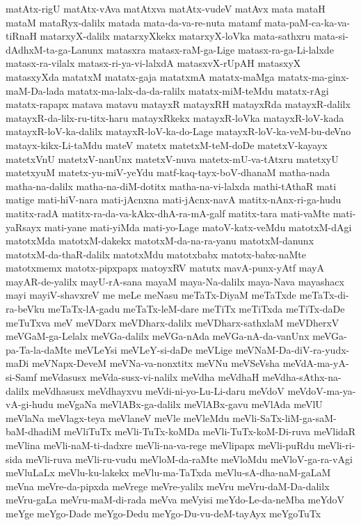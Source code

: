 {matAtx-rigU
matAtx-vAva
matAtxva
matAtx-vudeV
matAvx
mata
mataH
mataM
mataRyx-dalilx
matada
mata-da-va-re-nuta
matamf
mata-paM-ca-ka-va-tiRnaH
matarxyX-dalilx
matarxyXkekx
matarxyX-loVka
mata-sathxru
mata-si-dAdhxM-ta-ga-Lanunx
matasxra
matasx-raM-ga-Lige
matasx-ra-ga-Li-lalxde
matasx-ra-vilalx
matasx-ri-ya-vi-lalxdA
matasxvX-rUpAH
matasxyX
matasxyXda
matatxM
matatx-gaja
matatxmA
matatx-maMga
matatx-ma-ginx-maM-Da-lada
matatx-ma-lalx-da-da-ralilx
matatx-miM-teMdu
matatx-rAgi
matatx-rapapx
matava
matavu
matayxR
matayxRH
matayxRda
matayxR-dalilx
matayxR-da-lilx-ru-titx-haru
matayxRkekx
matayxR-loVka
matayxR-loV-kada
matayxR-loV-ka-dalilx
matayxR-loV-ka-do-Lage
matayxR-loV-ka-veM-bu-deVno
matayx-kikx-Li-taMdu
mateV
matetx
matetxM-teM-doDe
matetxV-kayayx
matetxVnU
matetxV-nanUnx
matetxV-nuva
matetx-mU-va-tAtxru
matetxyU
matetxyuM
matetx-yu-miV-yeYdu
matf-kaq-tayx-boV-dhanaM
matha-nada
matha-na-dalilx
matha-na-diM-dotitx
matha-na-vi-lalxda
mathi-tAthaR
mati
matige
mati-hiV-nara
mati-jAcnxna
mati-jAcnx-navA
matitx-nAnx-ri-ga-hudu
matitx-radA
matitx-ra-da-va-kAkx-dhA-ra-mA-galf
matitx-tara
mati-vaMte
mati-yaRsayx
mati-yane
mati-yiMda
mati-yo-Lage
matoV-katx-veMdu
matotxM-dAgi
matotxMda
matotxM-dakekx
matotxM-da-na-ra-yanu
matotxM-danunx
matotxM-da-thaR-dalilx
matotxMdu
matotxbabx
matotx-babx-naMte
matotxmemx
matotx-pipxpapx
matoyxRV
matutx
mavA-punx-yAtf
mayA
mayAR-de-yalilx
mayU-rA-sana
mayaM
maya-Na-dalilx
maya-Nava
mayashacx
mayi
mayiV-shavxreV
me
meLe
meNasu
meTaTx-DiyaM
meTaTxde
meTaTx-di-ra-beVku
meTaTx-lA-gadu
meTaTx-leM-dare
meTiTx
meTiTxda
meTiTx-daDe
meTuTxva
meV
meVDarx
meVDharx-dalilx
meVDharx-sathxlaM
meVDherxV
meVGaM-ga-Lelalx
meVGa-dalilx
meVGa-nAda
meVGa-nA-da-vanUnx
meVGa-pa-Ta-la-daMte
meVLeYsi
meVLeY-si-daDe
meVLige
meVNaM-Da-diV-ra-yudx-maDi
meVNapx-DeveM
meVNa-va-nonxtitx
meVNu
meVSeVsha
meVdA-ma-yA-si-Samf
meVdasusx
meVda-susx-vi-nalilx
meVdha
meVdhaH
meVdha-sAthx-na-dalilx
meVdhasusx
meVdhayxvu
meVdi-ni-yo-Lu-Li-daru
meVdoV
meVdoV-ma-ya-vA-gi-hudu
meVgaNa
meVlABx-ga-dalilx
meVlABx-gavu
meVlAda
meVlU
meVlaNa
meVlagx-teya
meVlaneV
meVle
meVleMdu
meVli-SaTx-liM-ga-saM-baM-dhadiM
meVliTuTx
meVli-TuTx-koMDa
meVli-TuTx-koM-Di-ruva
meVlidaR
meVlina
meVli-naM-ti-dadxre
meVli-na-va-rege
meVlipapx
meVli-puRdu
meVli-ri-sida
meVli-ruva
meVli-ru-vudu
meVloM-da-raMte
meVloMdu
meVloV-ga-ra-vAgi
meVluLaLx
meVlu-ku-lakekx
meVlu-ma-TaTxda
meVlu-sA-dha-naM-gaLaM
meVna
meVre-da-pipxda
meVrege
meVre-yalilx
meVru
meVru-daM-Da-dalilx
meVru-gaLa
meVru-maM-di-rada
meVva
meVyisi
meYdo-Le-da-neMba
meYdoV
meYge
meYgo-Dade
meYgo-Dedu
meYgo-Du-vu-deM-tayAyx
meYgoTuTx
}
